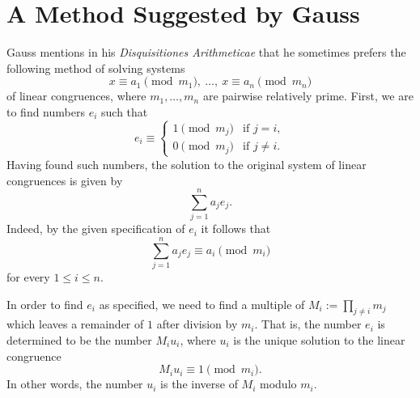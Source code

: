 \section{A Method Suggested by Gauss}

Gauss mentions in his \emph{Disquisitiones Arithmeticae} \cite[Article 36]{gauss1986} that he sometimes prefers the following method of solving systems
\begin{equation*}
  x\equiv a_1\pmod{m_1},~\ldots,~ x\equiv a_n\pmod{m_n}
\end{equation*}
of linear congruences, where $m_1,\ldots,m_n$ are pairwise relatively prime. First, we are to find numbers $e_i$ such that
\begin{equation}\label{equation:gauss-method-crt}
  e_i\equiv
  \begin{cases}
    1 \pmod{m_j} & \text{if }j=i,\\
    0 \pmod{m_j} & \text{if }j\neq i.
  \end{cases}
\end{equation}
Having found such numbers, the solution to the original system of linear congruences is given by
\begin{equation*}
  \sum_{j=1}^n a_je_j.
\end{equation*}
Indeed, by the given specification of $e_i$ it follows that
\begin{equation*}
  \sum_{j=1}^n a_je_j\equiv a_i\pmod{m_i}
\end{equation*}
for every $1\leq i\leq n$.

In order to find $e_i$ as specified, we need to find a multiple of $M_i := \prod_{j\neq i}m_j$ which leaves a remainder of $1$ after division by $m_i$. That is, the number $e_i$ is determined to be the number $M_i u_i$, where $u_i$ is the unique solution to the linear congruence
\begin{equation*}
  M_iu_i\equiv 1\pmod{m_i}.
\end{equation*}
In other words, the number $u_i$ is the inverse of $M_i$ modulo $m_i$.

